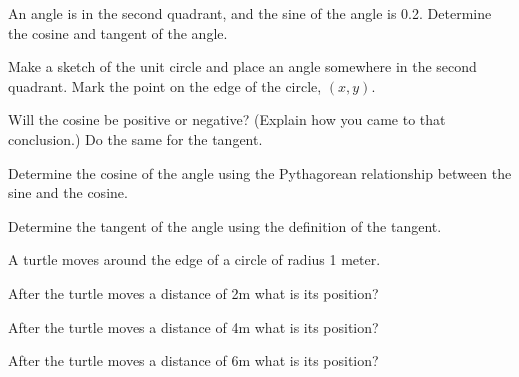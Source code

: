 \begin{problem}
  \item An angle is in the second quadrant, and the sine of the angle is 0.2.
    Determine the cosine and tangent of the angle.
  \begin{subproblem}
    \item Make a sketch of the unit circle and place an angle somewhere in the second quadrant.
    Mark the point on the edge of the circle, $(x,y)$.
    \vfill

    \item Will the cosine be positive or negative? (Explain how you came to that conclusion.)
      Do the same for the tangent.
      \vfill

    \item Determine the cosine of the angle using the Pythagorean relationship between the sine
        and the cosine.
        \vfill

    \item Determine the tangent of the angle using the definition of the tangent.
      \vfill
  \end{subproblem}

  \clearpage

  \item A turtle moves around the edge of a circle of radius 1 meter.
  \begin{subproblem}
    \item After the turtle moves a distance of 2m what is its position?
      \vfill
    \item After the turtle moves a distance of 4m what is its position?
      \vfill
    \item After the turtle moves a distance of 6m what is its position?
      \vfill
  \end{subproblem}

  \clearpage


\end{problem}
